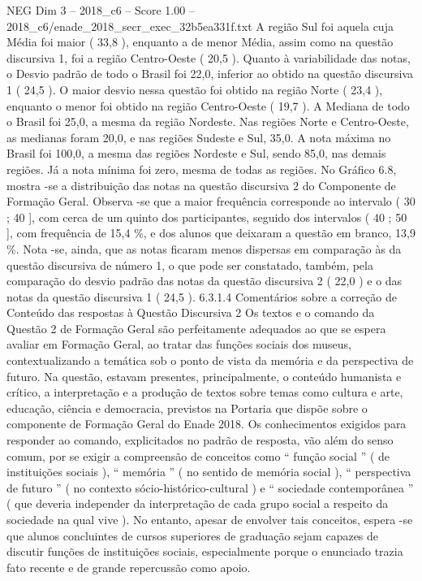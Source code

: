 \begin{textsample}{NEG Dim 3 – 2018\_c6 – Score 1.00 – 2018\_c6/enade\_2018\_secr\_exec\_32b5ea331f.txt}
A região Sul foi aquela cuja Média foi maior ( 33,8 ), enquanto a de menor Média, assim como na questão discursiva 1, foi a região Centro-Oeste ( 20,5 ).
Quanto à variabilidade das notas, o Desvio padrão de todo o Brasil foi 22,0, inferior ao obtido na questão discursiva 1 ( 24,5 ).
O maior desvio nessa questão foi obtido na região Norte ( 23,4 ), enquanto o menor foi obtido na região Centro-Oeste ( 19,7 ).
A Mediana de todo o Brasil foi 25,0, a mesma da região Nordeste.
Nas regiões Norte e Centro-Oeste, as medianas foram 20,0, e nas regiões Sudeste e Sul, 35,0.
A nota máxima no Brasil foi 100,0, a mesma das regiões Nordeste e Sul, sendo 85,0, nas demais regiões.
Já a nota mínima foi zero, mesma de todas as regiões.
No Gráfico 6.8, mostra -se a distribuição das notas na questão discursiva 2 do Componente de Formação Geral.
Observa -se que a maior frequência corresponde ao intervalo ( 30 ; 40 ], com cerca de um quinto dos participantes, seguido dos intervalos ( 40 ; 50 ], com frequência de 15,4 \%, e dos alunos que deixaram a questão em branco, 13,9 \%.
Nota -se, ainda, que as notas ficaram menos dispersas em comparação às da questão discursiva de número 1, o que pode ser constatado, também, pela comparação do desvio padrão das notas da questão discursiva 2 ( 22,0 ) e o das notas da questão discursiva 1 ( 24,5 ). 6.3.1.4 Comentários sobre a correção de Conteúdo das respostas à Questão Discursiva 2 Os textos e o comando da Questão 2 de Formação Geral são perfeitamente adequados ao que se espera avaliar em Formação Geral, ao tratar das funções sociais dos museus, contextualizando a temática sob o ponto de vista da memória e da perspectiva de futuro.
Na questão, estavam presentes, principalmente, o conteúdo humanista e crítico, a interpretação e a produção de textos sobre temas como cultura e arte, educação, ciência e democracia, previstos na Portaria que dispõe sobre o componente de Formação Geral do Enade 2018.
Os conhecimentos exigidos para responder ao comando, explicitados no padrão de resposta, vão além do senso comum, por se exigir a compreensão de conceitos como “ função social ” ( de instituições sociais ), “ memória ” ( no sentido de memória social ), “ perspectiva de futuro ” ( no contexto sócio-histórico-cultural ) e “ sociedade contemporânea ” ( que deveria independer da interpretação de cada grupo social a respeito da sociedade na qual vive ).
No entanto, apesar de envolver tais conceitos, espera -se que alunos concluintes de cursos superiores de graduação sejam capazes de discutir funções de instituições sociais, especialmente porque o enunciado trazia fato recente e de grande repercussão como apoio.

\end{textsample}
